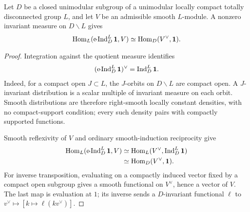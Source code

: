 \begin{lemma}\label{gu:app:duality}
Let $D$ be a closed unimodular subgroup of a unimodular locally compact
totally disconnected group $L$, and let $V$ be an admissible smooth
$L$-module. A nonzero invariant measure on $D\backslash L$ gives
\begin{equation}\label{gu:eq:closed-duality}
 \operatorname{Hom}_L(\operatorname{c\!-Ind}_D^L\mathbf1,V)
 \simeq\operatorname{Hom}_D(V^\vee,\mathbf1).
\end{equation}
\end{lemma}
\begin{proof}
Integration against the quotient measure identifies
\begin{equation}\label{gu:eq:compact-dual}
 (\operatorname{c\!-Ind}_D^L\mathbf1)^\vee=\operatorname{Ind}_D^L\mathbf1.
\end{equation}
Indeed, for a compact open $J\subset L$, the $J$-orbits on
$D\backslash L$ are compact open. A $J$-invariant distribution is a
scalar multiple of invariant measure on each orbit. Smooth
distributions are therefore right-smooth locally constant densities,
with no compact-support condition; every such density pairs with
compactly supported functions.

Smooth reflexivity of $V$ and ordinary smooth-induction reciprocity give
\[
 \begin{aligned}
 \operatorname{Hom}_L(\operatorname{c\!-Ind}_D^L\mathbf1,V)
 &\simeq\operatorname{Hom}_L(V^\vee,\operatorname{Ind}_D^L\mathbf1)\\
 &\simeq\operatorname{Hom}_D(V^\vee,\mathbf1).
 \end{aligned}
\]
For inverse transposition, evaluating on a compactly induced vector
fixed by a compact open subgroup gives a smooth functional on
$V^\vee$, hence a vector of $V$. The last map is evaluation at $1$; its inverse sends a
$D$-invariant functional $\ell$ to
$v^\vee\mapsto[k\mapsto\ell(kv^\vee)]$.
\end{proof}

